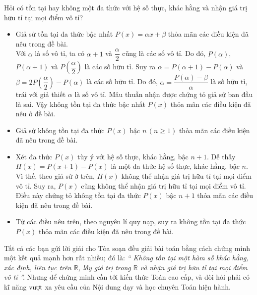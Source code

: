 \begin{bt}%
	Hỏi có tồn tại hay không một đa thức với hệ số thực, khác hằng và nhận giá trị hữu tỉ tại mọi điểm vô tỉ?
	\loigiai
	{
		\begin{itemize}
			\item Giả sử tồn tại đa thức bậc nhất $P(x)= \alpha x+\beta$ thỏa mãn các điều kiện đã nêu trong đề bài.\\
			Với $\alpha $ là số vô tỉ, ta có $\alpha +1$ và $\dfrac{\alpha}{2}$ cũng là các số vô tỉ. Do đó, $P(\alpha)$, $P(\alpha +1)$ và $P\left( \dfrac{\alpha}{2}\right)$ là các số hữu tỉ.
			Suy ra $\alpha = P(\alpha +1) -P(\alpha)$ và $\beta =2 P\left( \dfrac{\alpha}{2}\right) -P(\alpha)$ là các số hữu tỉ. Do đó, $\alpha = \dfrac{P(\alpha)-\beta}{\alpha}$ là số hữu tỉ, trái với giả thiết $\alpha$ là số vô tỉ. Mâu thuẫn nhận được chứng tỏ giả sử ban đầu là sai. Vậy không tồn tại đa thức bậc nhất $P(x)$ thỏa mãn các điều kiện đã nêu ở đề bài.
			\item  Giả sử không tồn tại đa thức $P(x)$ bậc $n \, (n\geq 1)$ thỏa mãn các điều kiện đã nêu trong đề bài.
			\item 
			Xét đa thức $P(x)$ tùy ý với hệ số thực, khác hằng, bậc $n+1$. Dễ thấy  $H(x)=P(x+1)-P(x)$ là một đa thức hệ số thực, khác hằng, bậc $n$. Vì thế, theo giả sử ở trên, $H(x)$ không thể nhận giá trị hữu tỉ tại mọi điểm vô tỉ. Suy ra, $P(x)$ cũng không thể nhận giá trị hữu tỉ tại mọi điểm vô tỉ. Điều này chứng tỏ không tồn tại đa thức $P(x)$ bậc $n+1$ thỏa mãn các điều kiện đã nêu trong đề bài.
			\item  Từ các điều nêu trên, theo nguyên lí quy nạp, suy ra không tồn tại đa thức $P(x)$ thỏa mãn các điều kiện đã nêu trong đề bài. 
		\end{itemize}
		\begin{nx}
			Tất cả các bạn gửi lời giải cho Tòa soạn đều giải bài toán bằng cách chứng minh một kết quả mạnh hơn rất nhiều; đó là:
			{\it `` Không tồn tại một hàm số khác hằng, xác định, liên tục trên $\mathbb{R}$, lấy giá trị trong $\mathbb{R}$ và nhận giá trị hữu tỉ tại mọi điểm vô tỉ ''. } Nhưng để chứng minh cần tới kiến thức Toán cao cấp, và đòi hỏi phải có kĩ năng vượt xa yêu cầu của Nội dung dạy và học chuyên Toán hiện hành. 
		\end{nx}
	}
\end{bt}

